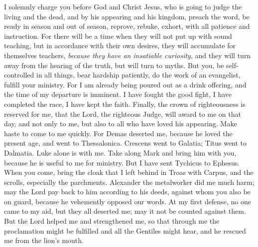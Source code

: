 \begin{biblechapter} %
 I solemnly charge you before God and Christ Jesus, who is going to judge the living and the dead, and by his appearing and his kingdom,
\verse preach the word, be ready in season and out of season, reprove, rebuke, exhort, with all patience and instruction.
\verse For there will be a time when they will not put up with sound teaching, but in accordance with their own desires, they will accumulate for themselves teachers, \textit{because they have an insatiable curiosity},
\verse and they will turn away from the hearing of the truth, but will turn to myths.
\verse But you, be self-controlled in all things, bear hardship patiently, do the work of an evangelist, fulfill your ministry.
\verse For I am already being poured out as a drink offering, and the time of my departure is imminent.
\verse I have fought the good fight, I have completed the race, I have kept the faith.
\verse Finally, the crown of righteousness is reserved for me, that the Lord, the righteous Judge, will award to me on that day, and not only to me, but also to all who have loved his appearing.
 Make haste to come to me quickly.
\verse For Demas deserted me, because he loved the present age, and went to Thessalonica. Crescens went to Galatia; Titus went to Dalmatia.
\verse Luke alone is with me. Take along Mark and bring him with you, because he is useful to me for ministry.
\verse But I have sent Tychicus to Ephesus.
\verse When you come, bring the cloak that I left behind in Troas with Carpus, and the scrolls, especially the parchments.
\verse Alexander the metalworker did me much harm; may the Lord pay back to him according to his deeds,
\verse against whom you also be on guard, because he vehemently opposed our words.
\verse At my first defense, no one came to my aid, but they all deserted me; may it not be counted against them.
\verse But the Lord helped me and strengthened me, so that through me the proclamation might be fulfilled and all the Gentiles might hear, and he rescued me from the lion’s mouth.

\end{biblechapter}
